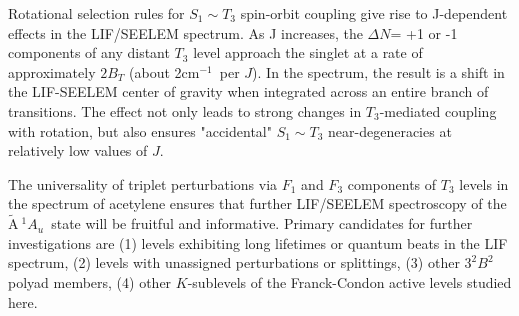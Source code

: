 \documentclass[12pt]{mitthesis}
\newcommand{\POINT}[1]{\textcolor{magenta}{#1}}
\newcommand{\rcm}{cm$^{-1}$}
\newcommand{\astate}{$
  \tilde{\text{A}} \: ^1\!A_u
  $}
\begin{document}
Rotational selection rules for $S_1 \sim T_3$ spin-orbit coupling give
rise to J-dependent effects in the LIF/SEELEM spectrum.  As J
increases, the $\Delta N$= +1 or -1 components of any distant $T_3$
level approach the singlet at a rate of approximately $2B_T$ (about
2\rcm\ per $J$).  In the spectrum, the result is a shift in the
LIF-SEELEM center of gravity when integrated across an entire branch
of transitions.  The effect not only leads to strong changes in
$T_3$-mediated coupling with rotation, but also ensures "accidental"
$S_1 \sim T_3$ near-degeneracies at relatively low values of $J$.


The universality of triplet perturbations via $F_1$ and $F_3$
components of $T_3$ levels in the spectrum of acetylene ensures that
further LIF/SEELEM spectroscopy of the \astate\ state will be fruitful
and informative.  Primary candidates for further investigations are
(1) levels exhibiting long lifetimes or quantum beats in the LIF
spectrum, (2) levels with unassigned perturbations or splittings, (3)
other $3^2B^2$ polyad members, (4) other $K$-sublevels of the
Franck-Condon active levels studied here.



\end{document}
